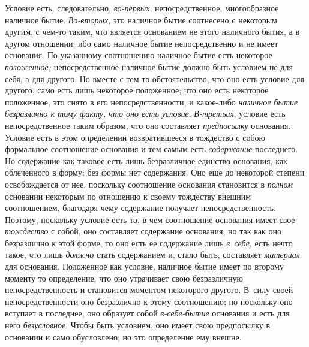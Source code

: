 Условие есть, следовательно, {\em во-первых},
непосредственное, многообразное наличное бытие.
{\em Во-вторых}, это наличное бытие соотнесено с
некоторым другим, с чем-то таким, что является основанием не этого
наличного бытия, а в другом отношении; ибо само наличное бытие
непосредственно и не имеет основания. По указанному соотношению наличное
бытие есть некоторое {\em положенное;} непосредственное
наличное бытие должно быть условием не для себя, а для другого. Но вместе с
тем то обстоятельство, что оно есть условие для другого, само есть лишь
некоторое положенное; что оно есть некоторое положенное, это снято в его
непосредственности, и какое-либо {\em наличное бытие
безразлично к тому факту, что оно есть условие}.
{\em В-третьих}, условие есть непосредственное таким
образом, что оно составляет {\em предпосылку}
основания. Условие есть в этом определении возвратившееся в тождество с
собою формальное соотношение основания и тем самым есть
{\em содержание} последнего. Но содержание как таковое
есть лишь безразличное единство основания, как облеченного в форму; без
формы нет содержания. Оно еще до некоторой степени освобождается от нее,
поскольку соотношение основания становится в
{\em полном} основании некоторым по отношению к своему
тождеству внешним соотношением, благодаря чему содержание получает
непосредственность. Поэтому, поскольку условие есть то, в чем соотношение
основания имеет свое {\em тождество} с собой, оно
составляет содержание основания; но так как оно безразлично к этой форме,
то оно есть ее содержание лишь {\em в~себе}, есть нечто
такое, что лишь {\em должно} стать содержанием и, стало
быть, составляет {\em материал} для основания.
Положенное как условие, наличное бытие имеет по второму моменту то
определение, что оно утрачивает свою безразличную непосредственность и
становится моментом некоторого другого. В~силу своей непосредственности оно
безразлично к этому соотношению; но поскольку оно вступает в последнее, оно
образует собой {\em в-себе-бытие} основания и есть для
него {\em безусловное}. Чтобы быть условием, оно имеет
свою предпосылку в основании и само обусловлено; но это определение ему внешне.

